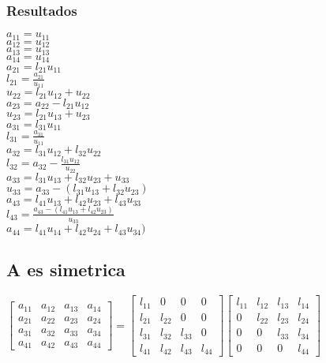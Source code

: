 \subsubsection{Resultados}
\begin{multicols}{2}
$a_{11}=u_{11}$ \\
$a_{12}=u_{12}$ \\
$a_{13}=u_{13}$ \\
$a_{14}=u_{14}$ \\
$a_{21}=l_{21}u_{11}$ \\
$l_{21}=\frac{a_{21}}{u_{11}}$ \\
$u_{22}=l_{21}u_{12}+u_{22}$ \\
$a_{23}=a_{22}-l_{21}u_{12}$ \\
$u_{23}=l_{21}u_{13}+u_{23}$ \\
$a_{31}=l_{31}u_{11}$ \\
$l_{31}=\frac{a_{31}}{u_{11}}$ \\
$a_{32}=l_{31}u_{12}+l_{32}u_{22}$ \\
$l_{32}=a_{32}-\frac{l_{31}u_{12}}{u_{22}}$ \\
$a_{33}=l_{31}u_{13}+l_{32}u_{23}+u_{33}$ \\
$u_{33}=a_{33}-(l_{31}u_{13}+l_{32}u_{23})$ \\
$a_{43}=l_{41}u_{13}+l_{42}u_{23}+l_{43}u_{33}$ \\
$l_{43}=\frac{a_{43}-(l_{41}u_{13}+l_{42}u_{23})}{u_{33}}$ \\
$a_{44}=l_{41}u_{14}+l_{42}u_{24}+l_{43}u_{34})$ \\
\end{multicols}
\subsection*{A es simetrica}
$\begin{bmatrix}
a_{11} & a_{12} & a_{13} & a_{14} \\
a_{21} & a_{22} & a_{23} & a_{24} \\
a_{31} & a_{32} & a_{33} & a_{34} \\
a_{41} & a_{42} & a_{43} & a_{44} 
\end{bmatrix}=\begin{bmatrix}
l_{11} & 0 & 0 & 0 \\
l_{21} & l_{22} & 0 & 0 \\
l_{31} & l_{32} & l_{33} & 0 \\
l_{41} & l_{42} & l_{43} & l_{44} 
\end{bmatrix}\begin{bmatrix}
l_{11} & l_{12} & l_{13} & l_{14} \\
0 & l_{22} & l_{23} & l_{24} \\
0 & 0 & l_{33} & l_{34} \\
0 & 0 & 0 & l_{44} 
\end{bmatrix} $
